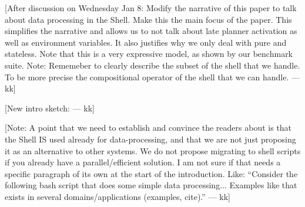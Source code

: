 \documentclass[letterpaper,twocolumn,10pt]{article}
\newcommand{\kk}[1]{[{\color{magenta}#1 --- kk}]}
\begin{document}
\kk{After discussion on Wednesday Jan 8: Modify the narrative of this
  paper to talk about data processing in the Shell. Make this the main
  focus of the paper. This simplifies the narrative and allows us to
  not talk about late planner activation as well as environment
  variables. It also justifies why we only deal with pure and
  stateless. Note that this is a very expressive model, as shown by
  our benchmark suite. Note: Rememeber to clearly describe the subset
  of the shell that we handle. To be more precise the compositional
  operator of the shell that we can handle.}

\kk{New intro sketch:}

\kk{Note: A point that we need to establish and convince the readers
  about is that the Shell IS used already for data-processing, and
  that we are not just proposing it as an alternative to other
  systems. We do not propose migrating to shell scripts if you already
  have a parallel/efficient solution. I am not sure if that needs a
  specific paragraph of its own at the start of the
  introduction. Like: ``Consider the following bash script that does
  some simple data processing... Examples like that exists in several
  domains/applications (examples, cite).''}
\end{document}
